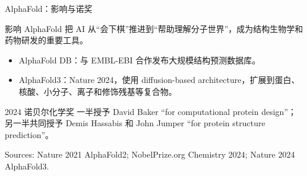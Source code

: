 \documentclass[UTF8,aspectratio=169,10pt]{ctexbeamer}
\begin{document}
\begin{frame}{AlphaFold：影响与诺奖}
  \footnotesize
  \begin{block}{影响}
    AlphaFold 把 AI 从“会下棋”推进到“帮助理解分子世界”，成为结构生物学和药物研发的重要工具。
  \end{block}

  \begin{itemize}
    \item AlphaFold DB：与 EMBL-EBI 合作发布大规模结构预测数据库。
    \item AlphaFold3：Nature 2024，使用 diffusion-based architecture，扩展到蛋白、核酸、小分子、离子和修饰残基等复合物。
  \end{itemize}

  \begin{alertblock}{2024 诺贝尔化学奖}
    一半授予 David Baker ``for computational protein design''；另一半共同授予 Demis Hassabis 和 John Jumper ``for protein structure prediction''。
  \end{alertblock}

  {\tiny Sources: Nature 2021 AlphaFold2; NobelPrize.org Chemistry 2024; Nature 2024 AlphaFold3.}
\end{frame}
\end{document}
